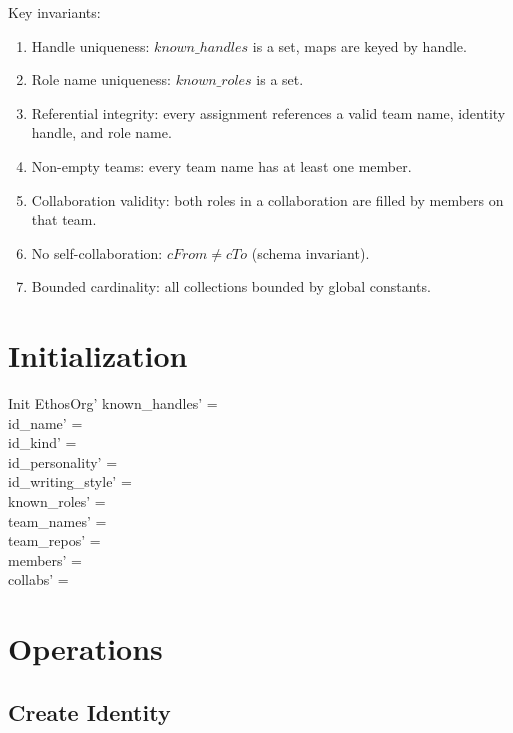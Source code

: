 \documentclass[a4paper,10pt,fleqn]{article}
\begin{document}
Key invariants:
\begin{enumerate}
  \item Handle uniqueness: $known\_handles$ is a set, maps are keyed by handle.
  \item Role name uniqueness: $known\_roles$ is a set.
  \item Referential integrity: every assignment references a valid
    team name, identity handle, and role name.
  \item Non-empty teams: every team name has at least one member.
  \item Collaboration validity: both roles in a collaboration are
    filled by members on that team.
  \item No self-collaboration: $cFrom \neq cTo$ (schema invariant).
  \item Bounded cardinality: all collections bounded by global constants.
\end{enumerate}

\section{Initialization}

\begin{schema}{Init}
  EthosOrg'
\where
  known\_handles' = \emptyset \\
  id\_name' = \emptyset \\
  id\_kind' = \emptyset \\
  id\_personality' = \emptyset \\
  id\_writing\_style' = \emptyset \\
  known\_roles' = \emptyset \\
  team\_names' = \emptyset \\
  team\_repos' = \emptyset \\
  members' = \emptyset \\
  collabs' = \emptyset
\end{schema}

\section{Operations}

\subsection{Create Identity}
\end{document}
